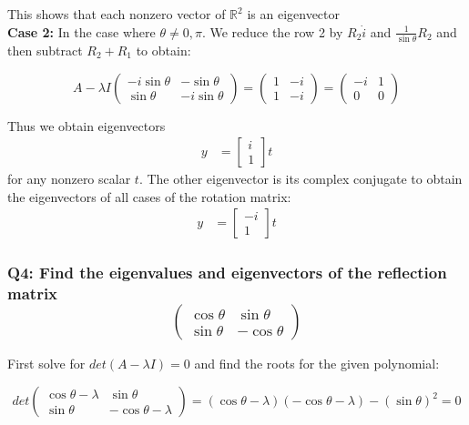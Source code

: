 \documentclass[8pt]{article}
\begin{document}
{This shows that each nonzero vector of $\mathbb{R}^{2}$ is an eigenvector \\

\textbf{Case 2:} In the case where $ \theta \neq 0, \pi$. We reduce the row 2 by $R_2 \dot i$ and $\frac{1}{\sin \theta} R_2$ and then subtract $R_2 + R_1$ to obtain: 

$$
A - \lambda I
\begin{pmatrix}
 -i \sin \theta & -\sin \theta \\
\sin \theta & -i \sin \theta 
\end{pmatrix} = 
\begin{pmatrix}
 1 & -i \\
1 & -i 
\end{pmatrix} =
\begin{pmatrix}
 -i & 1 \\
0 & 0 
\end{pmatrix}
$$

Thus we obtain eigenvectors   
\begin{align}
    y &= \begin{bmatrix}
           i \\
        1
         \end{bmatrix}t 
\end{align}
for any nonzero scalar $t$. The other eigenvector is its complex conjugate to obtain the eigenvectors of all cases of the rotation matrix: 
\begin{align}
    y &= \begin{bmatrix}
           -i \\
           1
         \end{bmatrix}t 
\end{align}




\subsubsection*{Q4: Find the eigenvalues and eigenvectors of the reflection matrix
$$
\begin{pmatrix}
\cos \theta & \sin \theta \\
\sin \theta & -\cos \theta
\end{pmatrix}
$$}

First solve for $det(A- \lambda I) = 0$ and find the roots for the given polynomial:

$$
det \begin{pmatrix}
\cos \theta - \lambda & \sin \theta \\
\sin \theta & -\cos \theta - \lambda
\end{pmatrix} = (\cos \theta - \lambda) (-\cos \theta - \lambda) - (\sin \theta)^{2} = 0 
$$

}
\end{document}

